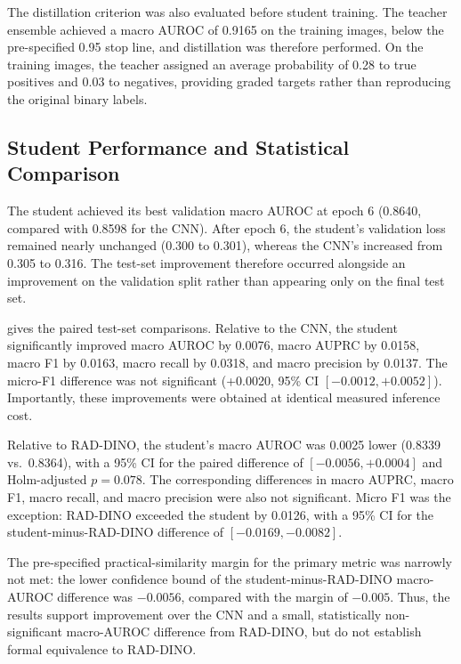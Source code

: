 \documentclass[conference]{IEEEtran}
\begin{document}
The distillation criterion was also evaluated before student training. The teacher ensemble achieved a macro AUROC of 0.9165 on the training images, below the pre-specified 0.95 stop line, and distillation was therefore performed. On the training images, the teacher assigned an average probability of 0.28 to true positives and 0.03 to negatives, providing graded targets rather than reproducing the original binary labels.

\subsection{Student Performance and Statistical Comparison}

The student achieved its best validation macro AUROC at epoch 6 (0.8640, compared with 0.8598 for the CNN). After epoch 6, the student's validation loss remained nearly unchanged (0.300 to 0.301), whereas the CNN's increased from 0.305 to 0.316. The test-set improvement therefore occurred alongside an improvement on the validation split rather than appearing only on the final test set.

 gives the paired test-set comparisons. Relative to the CNN, the student significantly improved macro AUROC by 0.0076, macro AUPRC by 0.0158, macro F1 by 0.0163, macro recall by 0.0318, and macro precision by 0.0137. The micro-F1 difference was not significant (+0.0020, 95\% CI $[-0.0012,+0.0052]$). Importantly, these improvements were obtained at identical measured inference cost.

Relative to RAD-DINO, the student's macro AUROC was 0.0025 lower (0.8339 vs.\ 0.8364), with a 95\% CI for the paired difference of $[-0.0056,+0.0004]$ and Holm-adjusted $p=0.078$. The corresponding differences in macro AUPRC, macro F1, macro recall, and macro precision were also not significant. Micro F1 was the exception: RAD-DINO exceeded the student by 0.0126, with a 95\% CI for the student-minus-RAD-DINO difference of $[-0.0169,-0.0082]$.

The pre-specified practical-similarity margin for the primary metric was narrowly not met: the lower confidence bound of the student-minus-RAD-DINO macro-AUROC difference was $-0.0056$, compared with the margin of $-0.005$. Thus, the results support improvement over the CNN and a small, statistically non-significant macro-AUROC difference from RAD-DINO, but do not establish formal equivalence to RAD-DINO.
\end{document}

